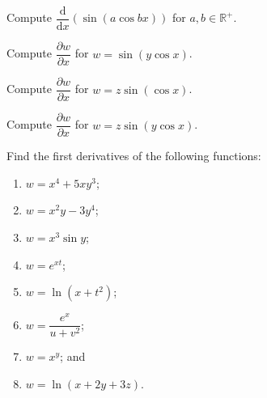 \documentclass[11pt]{article}
\theoremstyle{break}
\newcommand{\differentiate}[1]{\dfrac{\dd}{\dd{#1}}}
\newcommand{\pderivative}[2]{\dfrac{\partial {#1}}{\partial {#2}}}
\newcommand{\dd}{\text{d}}
\newcommand{\bbR}{\mathbb{R}}
\numberwithin{equation}{theorem}
\begin{document}
\begin{example}
    Compute $\differentiate{x}\left(\sin\left(a\cos bx\right)\right)$ for $a, b\in\bbR^+$.
\end{example}
\vspace{8em}

\begin{example}
    Compute $\pderivative{w}{x}$ for $w=\sin\left(y\cos x\right)$.
\end{example}
\vspace{8em}

\begin{example}
    Compute $\pderivative{w}{x}$ for $w=z\sin\left(\cos x\right)$.
\end{example}
\vspace{8em}

\begin{example}
    Compute $\pderivative{w}{x}$ for $w=z\sin\left(y\cos x\right)$.
\end{example}
\vspace{8em}

\begin{example}
    Find the first derivatives of the following functions:
    \begin{enumerate}
        \item $w=x^4+5xy^3$;
        \item $w=x^2y-3y^4$;
        \item $w=x^3\sin y$;
        \item $w=e^{xt}$;
        \item $w=\ln(x+t^2)$;
        \item $w=\dfrac{e^x}{u+v^2}$;
        \item $w=x^y$; and
        \item $w=\ln(x+2y+3z)$.
    \end{enumerate}
\end{example}
\end{document}
